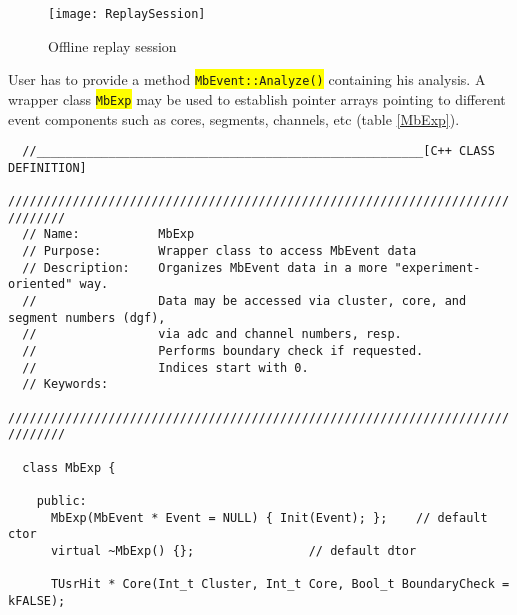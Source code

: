 \documentclass[10pt]{article}
\newcommand{\yellow}[1]{\colorbox{yellow}{\texttt{#1}}}
\newenvironment{yellowboxed}
	{\begin{Sbox}\begin{minipage}[t]}
	{\end{minipage}\end{Sbox}\colorbox{yellow}{\TheSbox}}
\begin{document}
\begin{figure}[H]
\centerline{\texttt{[image: ReplaySession]}}
\caption{Offline replay session}
\label{ReplayTreeData}
\end{figure}

User has to provide a method \yellow{MbEvent::Analyze()} containing his analysis. A wrapper class \yellow{MbExp} may be used
to establish pointer arrays pointing to different event components such as cores, segments, channels, etc (table \ref{MbExp}).

\begin{center}
\begin{table}[H]
{\scriptsize
\begin{yellowboxed}{\linewidth}
\verb-  //______________________________________________________[C++ CLASS DEFINITION]-\\
\verb+  //////////////////////////////////////////////////////////////////////////////+\\
\verb+  // Name:           MbExp+\\
\verb+  // Purpose:        Wrapper class to access MbEvent data+\\
\verb+  // Description:    Organizes MbEvent data in a more "experiment-oriented" way.+\\
\verb+  //                 Data may be accessed via cluster, core, and segment numbers (dgf),+\\
\verb+  //                 via adc and channel numbers, resp.+\\
\verb+  //                 Performs boundary check if requested.+\\
\verb+  //                 Indices start with 0.+\\
\verb+  // Keywords:+\\
\verb+  //////////////////////////////////////////////////////////////////////////////+\\
\verb+  +\\
\verb+  class MbExp {+\\
\verb+    +\\
\verb+    public:+\\
\verb+      MbExp(MbEvent * Event = NULL) { Init(Event); };    // default ctor+\\
\verb+      virtual ~MbExp() {};                // default dtor+\\
\verb+  +\\
\verb+      TUsrHit * Core(Int_t Cluster, Int_t Core, Bool_t BoundaryCheck = kFALSE);+\\

\end{yellowboxed}}
\end{table}
\end{center}
\end{document}
